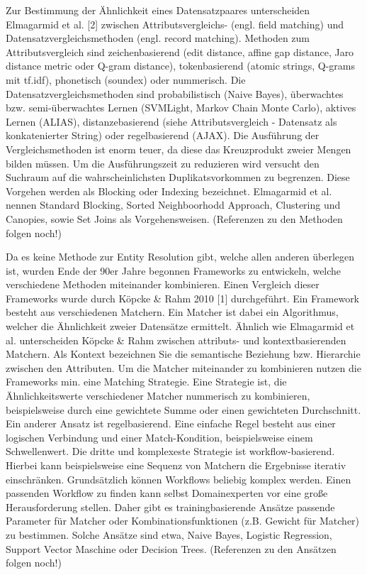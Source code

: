 \documentclass[%
	paper=A4,					%
	twoside=true,				%
	openright,					%
	parskip=full,				%
	chapterprefix=true,			%
	11pt,						%
	headings=normal,			%
	bibliography=totoc,			%
	listof=totoc,				%
	titlepage=on,				%
	captions=tableabove,		%
	draft=false,				%
]{scrreprt}%
\begin{document}
Zur Bestimmung der Ähnlichkeit eines Datensatzpaares unterscheiden
Elmagarmid et al. {[}2{]} zwischen Attributsvergleichs- (engl. field
matching) und Datensatzvergleichsmethoden (engl. record matching).
Methoden zum Attributsvergleich sind zeichenbasierend (edit distance,
affine gap distance, Jaro distance metric oder Q-gram distance),
tokenbasierend (atomic strings, Q-grams mit tf.idf), phonetisch
(soundex) oder nummerisch. Die Datensatzvergleichsmethoden sind
probabilistisch (Naive Bayes), überwachtes bzw. semi-überwachtes Lernen
(SVMLight, Markov Chain Monte Carlo), aktives Lernen (ALIAS),
distanzebasierend (siehe Attributsvergleich - Datensatz als
konkatenierter String) oder regelbasierend (AJAX). Die Ausführung der
Vergleichsmethoden ist enorm teuer, da diese das Kreuzprodukt zweier
Mengen bilden müssen. Um die Ausführungszeit zu reduzieren wird versucht
den Suchraum auf die wahrscheinlichsten Duplikatsvorkommen zu begrenzen.
Diese Vorgehen werden als Blocking oder Indexing bezeichnet. Elmagarmid
et al. nennen Standard Blocking, Sorted Neighboorhodd Approach,
Clustering und Canopies, sowie Set Joins als Vorgehensweisen.
(Referenzen zu den Methoden folgen noch!)

Da es keine Methode zur Entity Resolution gibt, welche allen anderen
überlegen ist, wurden Ende der 90er Jahre begonnen Frameworks zu
entwickeln, welche verschiedene Methoden miteinander kombinieren. Einen
Vergleich dieser Frameworks wurde durch Köpcke \& Rahm 2010 {[}1{]}
durchgeführt. Ein Framework besteht aus verschiedenen Matchern. Ein
Matcher ist dabei ein Algorithmus, welcher die Ähnlichkeit zweier
Datensätze ermittelt. Ähnlich wie Elmagarmid et al. unterscheiden Köpcke
\& Rahm zwischen attributs- und kontextbasierenden Matchern. Als Kontext
bezeichnen Sie die semantische Beziehung bzw. Hierarchie zwischen den
Attributen. Um die Matcher miteinander zu kombinieren nutzen die
Frameworks min. eine Matching Strategie. Eine Strategie ist, die
Ähnlichkeitswerte verschiedener Matcher nummerisch zu kombinieren,
beispielsweise durch eine gewichtete Summe oder einen gewichteten
Durchschnitt. Ein anderer Ansatz ist regelbasierend. Eine einfache Regel
besteht aus einer logischen Verbindung und einer Match-Kondition,
beispielsweise einem Schwellenwert. Die dritte und komplexeste Strategie
ist workflow-basierend. Hierbei kann beispielsweise eine Sequenz von
Matchern die Ergebnisse iterativ einschränken. Grundsätzlich können
Workflows beliebig komplex werden. Einen passenden Workflow zu finden
kann selbst Domainexperten vor eine große Herausforderung stellen. Daher
gibt es trainingbasierende Ansätze passende Parameter für Matcher oder
Kombinationsfunktionen (z.B. Gewicht für Matcher) zu bestimmen. Solche
Ansätze sind etwa, Naive Bayes, Logistic Regression, Support Vector
Maschine oder Decision Trees. (Referenzen zu den Ansätzen folgen noch!)
\end{document}

